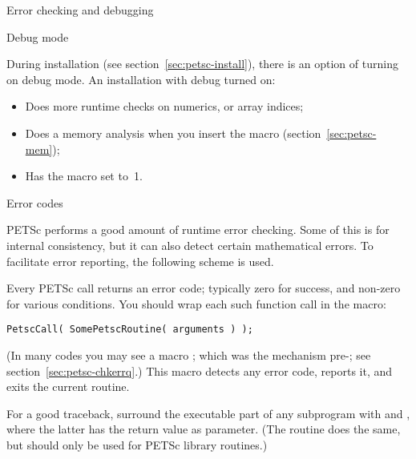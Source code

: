 
 {Error checking and debugging}

 {Debug mode}
\label{sec:petsc-debug-mode}

During installation (see section~\ref{sec:petsc-install}),
there is an option of turning on debug mode.
An installation with debug turned on:
\begin{itemize}
\item Does more runtime checks on numerics, or array indices;
\item Does a memory analysis when you insert the  macro
  (section~\ref{sec:petsc-mem});
\item Has the macro  set to~1.
\end{itemize}

 {Error codes}
\label{sec:petsc-error}

PETSc performs a good amount of runtime error checking. Some of this
is for internal consistency, but it can also detect certain
mathematical errors. To facilitate error reporting, the following
scheme is used.

Every PETSc call returns an error code;
typically zero for success, and non-zero for various conditions.
You should wrap each such function call in the
 macro:
\begin{lstlisting}
PetscCall( SomePetscRoutine( arguments ) );
\end{lstlisting}
(In many codes you may see a macro ;
which was the mechanism pre-;
see section~\ref{sec:petsc-chkerrq}.)
This macro detects any error code, reports it, and exits
the current routine.

For a good traceback, surround the executable part of any subprogram
with  and ,
where the latter has the return value as parameter.
(The routine  does the same, but
should only be used for PETSc library routines.)

